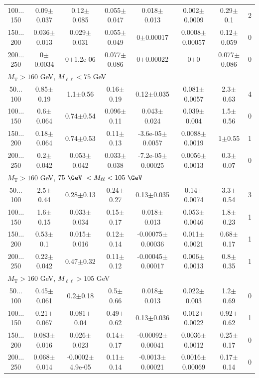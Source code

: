 \begin{landscape}
\begin{table}
\begin{center}
\begin{tabular}{| c | c c c c c c c | }
100$\dots$150&0.09$\pm$0.037&0.12$\pm$0.085&0.055$\pm$0.047&0.018$\pm$0.013&0.002$\pm$0.0009&0.29$\pm$0.1&2\\
150$\dots$200&0.036$\pm$0.013&0.029$\pm$0.031&0.055$\pm$0.049&0$\pm$0.00017&0.0008$\pm$0.00057&0.12$\pm$0.059&0\\
200$\dots$250&0$\pm$0.0034&0$\pm$1.2e-06&0.077$\pm$0.086&0$\pm$0.00022&0$\pm$0&0.077$\pm$0.086&0\\
\hline\hline
\multicolumn{8}{l}{$M_{\text{T}} > 160$ GeV, $M_{\ell\ell} < 75$ GeV}\\\hline\hline
50$\dots$100&0.85$\pm$0.19&1.1$\pm$0.56&0.16$\pm$0.19&0.12$\pm$0.035&0.081$\pm$0.0057&2.3$\pm$0.63&4\\
100$\dots$150&0.6$\pm$0.064&0.74$\pm$0.54&0.096$\pm$0.11&0.043$\pm$0.024&0.039$\pm$0.004&1.5$\pm$0.56&0\\
150$\dots$200&0.18$\pm$0.064&0.74$\pm$0.53&0.11$\pm$0.13&-3.6e-05$\pm$0.0057&0.0088$\pm$0.0019&1$\pm$0.55&1\\
200$\dots$250&0.2$\pm$0.042&0.053$\pm$0.042&0.033$\pm$0.038&-7.2e-05$\pm$0.00025&0.0056$\pm$0.0013&0.3$\pm$0.07&0\\
\hline\hline
\multicolumn{8}{l}{$M_{\text{T}} > 160$ GeV, $75~\GeV~< M_{\ell\ell} < 105~\GeV~$}\\\hline\hline
50$\dots$100&2.5$\pm$0.44&0.28$\pm$0.13&0.24$\pm$0.27&0.13$\pm$0.035&0.14$\pm$0.0074&3.3$\pm$0.54&3\\
100$\dots$150&1.6$\pm$0.15&0.033$\pm$0.034&0.15$\pm$0.17&0.018$\pm$0.013&0.053$\pm$0.0046&1.8$\pm$0.23&1\\
150$\dots$200&0.53$\pm$0.1&0.015$\pm$0.016&0.12$\pm$0.14&-0.00075$\pm$0.00036&0.011$\pm$0.0021&0.68$\pm$0.17&1\\
200$\dots$250&0.22$\pm$0.042&0.47$\pm$0.32&0.11$\pm$0.12&-0.00045$\pm$0.00017&0.006$\pm$0.0013&0.8$\pm$0.35&1\\
\hline\hline
\multicolumn{8}{l}{$M_{\text{T}} > 160$ GeV, $M_{\ell\ell} > 105$ GeV}\\\hline\hline
50$\dots$100&0.45$\pm$0.061&0.2$\pm$0.18&0.5$\pm$0.66&0.018$\pm$0.013&0.022$\pm$0.003&1.2$\pm$0.69&0\\
100$\dots$150&0.21$\pm$0.067&0.081$\pm$0.04&0.49$\pm$0.62&0.13$\pm$0.036&0.012$\pm$0.0022&0.92$\pm$0.62&1\\
150$\dots$200&0.083$\pm$0.016&0.026$\pm$0.023&0.14$\pm$0.17&-0.00092$\pm$0.00041&0.0036$\pm$0.0012&0.25$\pm$0.17&0\\
200$\dots$250&0.068$\pm$0.014&-0.0002$\pm$4.9e-05&0.11$\pm$0.14&-0.0013$\pm$0.00021&0.0016$\pm$0.00069&0.17$\pm$0.14&0\\

\end{tabular}
\end{center}
\end{table}
\end{landscape}
